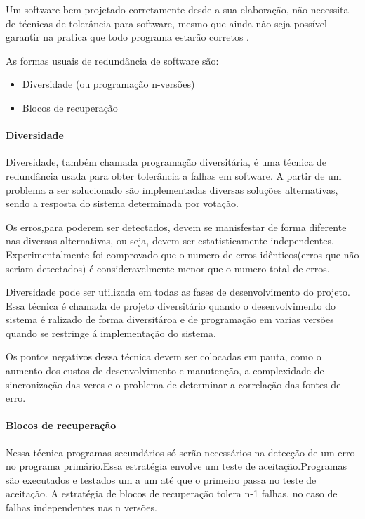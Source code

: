 Um software bem projetado corretamente desde a sua elaboração, não necessita de técnicas de tolerância para software, mesmo que ainda não seja possível garantir na pratica que todo programa estarão corretos \cite{webertolerancia}.

As formas usuais de redundância de software são:

\begin{itemize}
	\item Diversidade (ou programação n-versões)
	\item Blocos de recuperação
\end{itemize}

\paragraph{Diversidade}

Diversidade, também chamada programação diversitária, é uma técnica de redundância usada para obter tolerância a falhas em software. A partir de um problema a ser solucionado são implementadas diversas soluções alternativas, sendo a resposta do sistema determinada por votação.

Os erros,para poderem ser detectados, devem se manisfestar de forma diferente nas diversas alternativas, ou seja, devem ser estatisticamente independentes. Experimentalmente foi comprovado que o numero de erros idênticos(erros que não seriam detectados) é consideravelmente menor que o numero total de erros.

Diversidade pode ser utilizada em todas as fases de desenvolvimento do projeto. Essa técnica é chamada de projeto diversitário quando o desenvolvimento do sistema é ralizado de forma diversitároa e de programação em varias versões quando se restringe á implementação do sistema.

Os pontos negativos dessa técnica devem ser colocadas em pauta, como o aumento dos custos de desenvolvimento e manutenção, a complexidade de sincronização das veres e o problema de determinar a correlação das fontes de erro.

\paragraph{Blocos de recuperação}

Nessa técnica programas secundários só serão necessários na detecção de um erro no programa primário.Essa estratégia envolve um teste de aceitação.Programas são executados e testados um a um até que o primeiro passa no teste de aceitação. A estratégia de blocos de recuperação tolera n-1 falhas, no caso de falhas independentes nas n versões.

